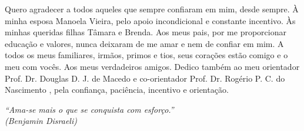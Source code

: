 \documentclass[
	12pt,				%
	oneside,			%
	a4paper,			%
	english,			%
	brazil				%
	]{abntex2ppgsi}
\begin{document}
%
% 
%
\begin{agradecimentos}
Quero agradecer a todos aqueles que sempre confiaram em mim, desde sempre.
À minha esposa Manoela Vieira, pelo apoio incondicional e constante incentivo. Às minhas queridas filhas Tâmara e Brenda. Aos meus pais, por me proporcionar educação e valores, nunca deixaram de me amar e nem de confiar em mim. A todos os meus familiares, irmãos, primos e tios, seus corações estão comigo e o meu com vocês. Aos meus verdadeiros amigos. Dedico também ao meu orientador Prof. Dr. Douglas D. J. de Macedo e co-orientador  Prof. Dr. Rogério P. C. do Nascimento , pela confiança, paciência, incentivo e orientação. 
\end{agradecimentos}

%
% 
\begin{epigrafe}
    \vspace*{\fill}
	\begin{flushright}
		\textit{``Ama-se mais o que se conquista com esforço.''\\
		(Benjamin Disraeli)}
	\end{flushright}
\end{epigrafe}

\end{document}
